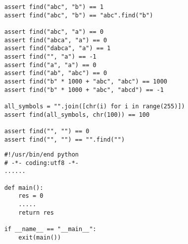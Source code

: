 \documentclass{article}
\begin{document}
\begin{lstlisting}
	assert find("abc", "b") == 1
	assert find("abc", "b") == "abc".find("b")

	assert find("abc", "a") == 0
	assert find("abca", "a") == 0
	assert find("dabca", "a") == 1
	assert find("", "a") == -1
	assert find("a", "a") == 0
	assert find("ab", "abc") == 0
	assert find("b" * 1000 + "abc", "abc") == 1000
	assert find("b" * 1000 + "abc", "abcd") == -1

	all_symbols = "".join([chr(i) for i in range(255)])
	assert find(all_symbols, chr(100)) == 100

	assert find("", "") == 0
	assert find("", "") == "".find("")
\end{lstlisting}
\newpage
\begin{lstlisting}
	#!/usr/bin/end python
	# -*- coding:utf8 -*-
	......

	def main():
		res = 0
		.....
		return res

	if __name__ == "__main__":
		exit(main())
\end{lstlisting}
\newpage
\end{document}

